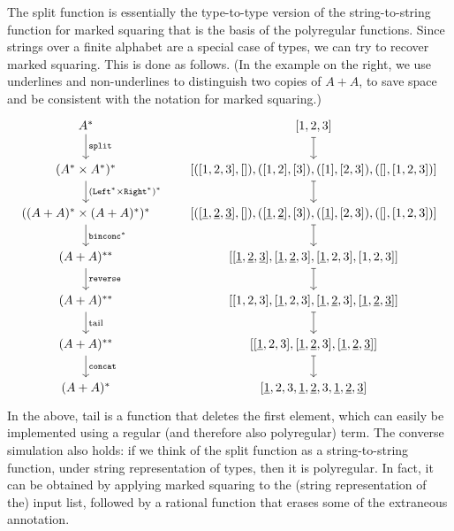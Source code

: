 \begin{myexample} \label{ex:split-and-marked-square} The split function is essentially the type-to-type version of the string-to-string function for marked squaring that is the basis of the polyregular functions. Since strings over a finite alphabet are a special case of types, we can try to recover marked squaring. This is done as follows. (In the example on the right, we use underlines and non-underlines to distinguish two copies of $A+A$, to save space and be consistent with the notation for marked squaring.)
\[
\begin{tikzcd}
A^* 
\ar[d,"\splitterm"] 
&
{[1,2,3]}
\ar[d,mapsto]
\\
(A^* \times A^*)^* 
\ar[d, "{(\leftterm^* \times \rightterm^*)^*}"]
&
{[([1,2,3],[]),  ([1,2],[3]),  ([1],[2,3]),  ([],[1,2,3])]}
\ar[d,mapsto]
\\
((A+A)^* \times (A+A)^*)^*
\ar[d,"{\binconcterm^*}"]
&
{[([\underline 1,\underline  2,\underline  3],[]),  ([\underline  1,\underline 2],[3]),  ([\underline 1],[2,3]),  ([],[1,2,3])]}
\ar[d,mapsto]
\\
(A+A)^{**}
\ar[d,"{\reverseterm}"]
&
{[[\underline 1,\underline  2,\underline  3],  [\underline  1,\underline 2,3],  [\underline 1,2,3],  [1,2,3]]}
\ar[d,mapsto]
\\
(A+A)^{**}
\ar[d,"{\text{tail}}"]
&
{[[1,2,3],[\underline 1,2,3], [\underline  1,\underline 2,3], [\underline 1,\underline  2,\underline  3]]}
\ar[d,mapsto]
\\
(A+A)^{**}
\ar[d,"{\concatterm}"]
&
{[[\underline 1,2,3], [\underline  1,\underline 2,3], [\underline 1,\underline  2,\underline  3]]}
\ar[d,mapsto]
\\
(A+A)^{*}
&
{[\underline 1,2,3,\underline  1,\underline 2,3,\underline 1,\underline  2,\underline  3]}
\end{tikzcd}
\]
In the above, tail is a function that deletes the first element, which can easily be implemented using a regular (and therefore also polyregular) term. The converse simulation also holds: if we think of the split function as a string-to-string function, under string representation of types, then it is polyregular.  In fact, it can be obtained by applying marked squaring to the (string representation of the) input list, followed by a rational function that erases some of the extraneous annotation. 
\end{myexample}








